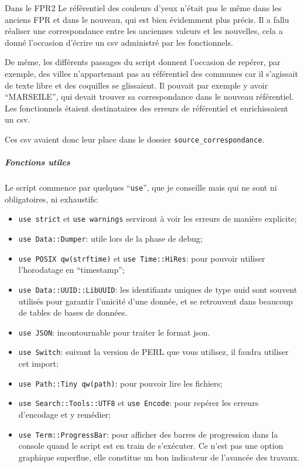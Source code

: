 \documentclass{book}
\begin{document}
  \begin{bclogo}[arrondi = 0.1, couleur = blue!10, logo = \bcinfo]{Dans le FPR2}
Le référentiel des couleurs d'yeux n'était pas le même dans les anciens FPR et dans le nouveau, qui est bien évidemment plus précis. Il a fallu réaliser une correspondance entre les anciennes valeurs et les nouvelles, cela a donné l'occasion d'écrire un \gls{csv} administré par les \gls{fonctionnels}.

De même, les différents passages du script donnent l'occasion de repérer, par exemple, des villes n'appartenant pas au référentiel des communes car il s'agissait de texte libre et des coquilles se glissaient. Il pouvait par exemple y avoir ``MARSEILE'', qui devait trouver sa correspondance dans le nouveau référentiel. Les \gls{fonctionnels} étaient destinataires des erreurs de référentiel et enrichissaient un \gls{csv}.

Ces \gls{csv} avaient donc leur place dans le dossier \texttt{source\_correspondance}.
  \end{bclogo}

\subparagraph{Fonctions utiles}

Le script commence par quelques ``\texttt{use}'', que je conseille mais qui ne sont ni obligatoires, ni exhaustifs:
\begin{itemize}
 \item \texttt{use strict} et \texttt{use warnings} serviront à voir les erreurs de manière explicite;
 \item \texttt{use Data::Dumper}: utile lors de la phase de debug;
 \item \texttt{use POSIX qw(strftime)} et \texttt{use Time::HiRes}: pour pouvoir utiliser l'horodatage en ``timestamp'';
 \item \texttt{use Data::UUID::LibUUID}: les identifiants uniques de type \gls{uuid} sont souvent utilisés pour garantir l'unicité d'une donnée, et se retrouvent dans beaucoup de tables de bases de données.
 \item \texttt{use JSON}: incontournable pour traiter le format \gls{json}.
 \item \texttt{use Switch}: suivant la version de PERL que vous utilisez, il faudra utiliser cet import;
 \item \texttt{use Path::Tiny qw(path)}: pour pouvoir lire les fichiers;
 \item \texttt{use Search::Tools::UTF8} et \texttt{use Encode}: pour repérer les erreurs d'encodage et y remédier;
 \item \texttt{use Term::ProgressBar}: pour afficher des barres de progression dans la console quand le script est en train de s'exécuter. Ce n'est pas une option graphique superflue, elle constitue un bon indicateur de l’avancée
des travaux.
\end{itemize}
\end{document}
